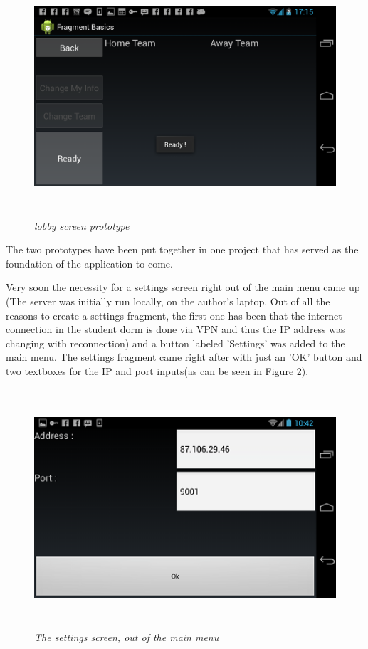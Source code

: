 \begin{figure}
\includegraphics[height=3.5in,width=6.23in]{./images/android_screenshots/menu_prototype/MENU_prototype_2.png}  
\caption{\small \sl lobby screen prototype \label{fig:menuPrototype2}}
\end{figure}

The two prototypes have been put together in one project that has served as the
foundation of the application to come.\newline

Very soon the necessity for a settings screen right out of the main menu came up
(The server was initially run locally, on the author's laptop. Out of all the
reasons to create a settings fragment, the first one has been that the internet
connection in the student dorm is done via VPN and thus the IP address was
changing with reconnection) and a button labeled 'Settings' was added to the
main menu. The settings fragment came right after with just an 'OK' button and
two textboxes for the IP and port inputs(as can be seen in Figure
\ref{fig:main_menu_settings}).\newline

\begin{figure}
\includegraphics[height=3.5in,width=6.23in]{./images/android_screenshots/tutorial_main_settings.png}  
\caption{\small \sl The settings screen, out of the main
menu\label{fig:main_menu_settings}}
\end{figure}


